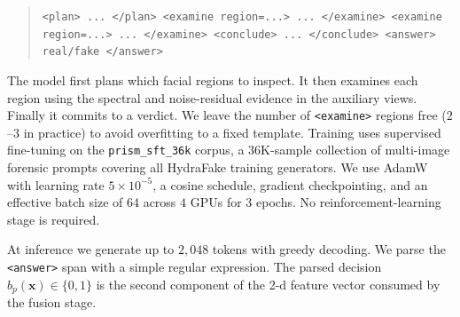 \documentclass[10pt,twocolumn,letterpaper]{article}
\begin{document}
\begin{quote}
\small
\texttt{<plan> ... </plan> <examine region=...> ... </examine> <examine region=...> ... </examine> <conclude> ... </conclude> <answer> real/fake </answer>}
\end{quote}
The model first plans which facial regions to inspect. It then examines each region using the spectral and noise-residual evidence in the auxiliary views. Finally it commits to a verdict. We leave the number of \texttt{<examine>} regions free ($2$--$3$ in practice) to avoid overfitting to a fixed template. Training uses supervised fine-tuning on the \texttt{prism\_sft\_36k} corpus, a $36$K-sample collection of multi-image forensic prompts covering all HydraFake training generators. We use AdamW with learning rate $5{\times}10^{-5}$, a cosine schedule, gradient checkpointing, and an effective batch size of $64$ across $4$ GPUs for $3$ epochs. No reinforcement-learning stage is required.

At inference we generate up to $2{,}048$ tokens with greedy decoding. We parse the \texttt{<answer>} span with a simple regular expression. The parsed decision $b_p(\mathbf{x})\!\in\!\{0,1\}$ is the second component of the 2-d feature vector consumed by the fusion stage.
\end{document}
